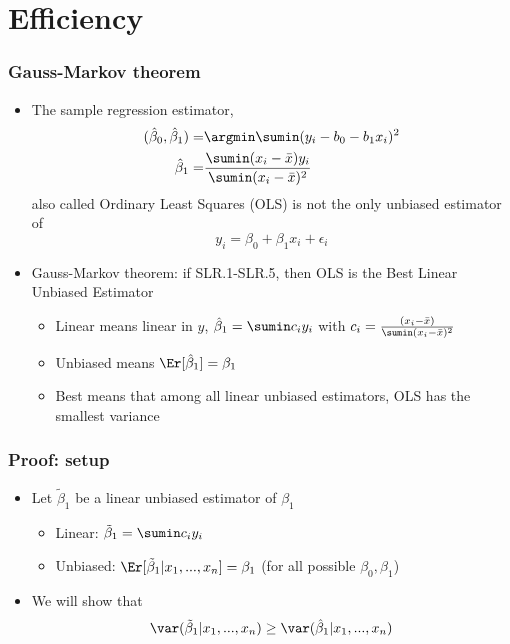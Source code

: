 \section{Efficiency}
\begin{frame}[shrink]
  \frametitle{Gauss-Markov theorem}
  \begin{itemize}
  \item The sample regression estimator,
    \begin{align*} (\hat{\beta}_0, \hat{\beta}_1) = & \argmin \sumin (y_i - b_0 -
      b_1 x_i)^2 \\
      \hat{\beta}_1 = & \frac{\sumin (x_i - \bar{x}) y_i}{\sumin(x_i -
        \bar{x})^2}
    \end{align*}
    also called \alert{O}rdinary \alert{L}east \alert{S}quares (OLS)
    is not the only unbiased estimator of 
    \[ y_i = \beta_0 + \beta_1 x_i + \epsilon_i \]
  \item \alert{Gauss-Markov theorem:} if SLR.1-SLR.5, then OLS is the
    \alert{B}est \alert{L}inear \alert{U}nbiased \alert{E}stimator
    \begin{itemize}
    \item Linear means linear in $y$, $\hat{\beta}_1 = \sumin c_i y_i$
      with $c_i = \frac{(x_i - \bar{x})}{\sumin (x_i - \bar{x})^2}$
    \item Unbiased means $\Er[\hat{\beta}_1] = \beta_1$
    \item Best means that among all linear unbiased estimators, OLS
      has the smallest variance
    \end{itemize}
  \end{itemize}
\end{frame}

\begin{frame}\frametitle{Proof: setup}
  \begin{itemize}
  \item Let $\tilde{\beta}_1$ be a linear unbiased estimator of
    $\beta_1$
    \begin{itemize}
    \item Linear: $\tilde{\beta}_1 = \sumin c_i y_i$
    \item Unbiased: $\Er[\tilde{\beta}_1|x_1, ...,x_n] = \beta_1$ (for all possible
      $\beta_0,\beta_1$)    
    \end{itemize}
  \item We will show that 
    \[ \var(\tilde{\beta}_1 | x_1, ... , x_n) \geq \var(\hat{\beta}_1
    | x_1, ..., x_n) \]
  \end{itemize}  
\end{frame}

